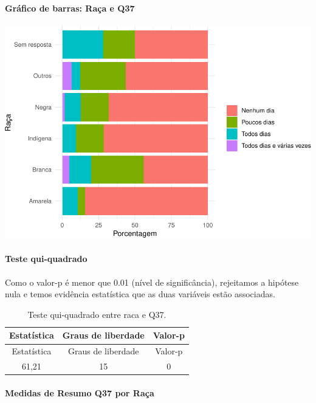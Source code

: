 \documentclass[]{article}
\let\oldparagraph\paragraph
\renewcommand{\paragraph}[1]{\oldparagraph{#1}\mbox{}}
\begin{document}
\hypertarget{gruxe1fico-de-barras-rauxe7a-e-q37}{%
\paragraph{Gráfico de barras: Raça e Q37}\label{gruxe1fico-de-barras-rauxe7a-e-q37}}

\begin{center}\includegraphics[width=0.75\linewidth]{relatorio_covid19_files/figure-latex/unnamed-chunk-1400-1} \end{center}

\hypertarget{teste-qui-quadrado-120}{%
\paragraph{Teste qui-quadrado}\label{teste-qui-quadrado-120}}

Como o valor-p é menor que 0.01 (nível de significância), rejeitamos a hipótese nula e temos evidência estatística que as duas variáveis estão associadas.

\begin{longtable}[]{@{}ccc@{}}
\caption{\label{tab:unnamed-chunk-1402}Teste qui-quadrado entre raca e Q37.}\tabularnewline
\toprule
Estatística & Graus de liberdade & Valor-p\tabularnewline
\midrule
\endfirsthead
\toprule
Estatística & Graus de liberdade & Valor-p\tabularnewline
\midrule
\endhead
61,21 & 15 & 0\tabularnewline
\bottomrule
\end{longtable}

\cleardoublepage

\hypertarget{medidas-de-resumo-q37-por-rauxe7a}{%
\paragraph{Medidas de Resumo Q37 por Raça}\label{medidas-de-resumo-q37-por-rauxe7a}}
\end{document}
